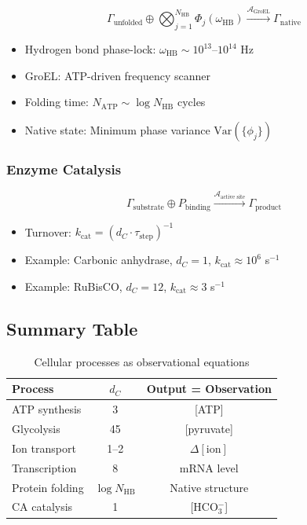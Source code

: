 \documentclass[aps,prd,twocolumn,superscriptaddress,floatfix,nofootinbib]{revtex4-2}
\theoremstyle{remark}
\newcommand{\Pop}{P}
\newcommand{\Gstate}{\Gamma}
\begin{document}
\begin{equation}
\Gstate_{\text{unfolded}} \oplus \bigotimes_{j=1}^{N_{\text{HB}}} \Phi_j(\omega_{\text{HB}}) \xrightarrow{\mathcal{A}_{\text{GroEL}}} \Gstate_{\text{native}}
\end{equation}

\begin{itemize}
\item Hydrogen bond phase-lock: $\omega_{\text{HB}} \sim 10^{13}$--$10^{14}$ Hz~\cite{fayer2012}
\item GroEL: ATP-driven frequency scanner~\cite{horwich1999,hartl2011}
\item Folding time: $N_{\text{ATP}} \sim \log N_{\text{HB}}$ cycles~\cite{anfinsen1973}
\item Native state: Minimum phase variance $\text{Var}(\{\phi_j\})$~\cite{onuchic2004}
\end{itemize}

\subsubsection{Enzyme Catalysis}

\begin{equation}
\Gstate_{\text{substrate}} \oplus \Pop_{\text{binding}} \xrightarrow{\mathcal{A}_{\text{active site}}} \Gstate_{\text{product}}
\end{equation}

\begin{itemize}
\item Turnover: $k_{\text{cat}} = (d_C \cdot \tau_{\text{step}})^{-1}$~\cite{michaelis1913,fersht1999}
\item Example: Carbonic anhydrase, $d_C = 1$, $k_{\text{cat}} \approx 10^6$ s$^{-1}$~\cite{lindskog1997}
\item Example: RuBisCO, $d_C = 12$, $k_{\text{cat}} \approx 3$ s$^{-1}$~\cite{andersson2008}
\end{itemize}

\subsection{Summary Table}

\begin{table}[h]
\centering
\caption{Cellular processes as observational equations}
\label{tab:processes}
\begin{tabular}{@{}lcc@{}}
\toprule
Process & $d_C$ & Output = Observation \\
\midrule
ATP synthesis & 3 & [ATP] \\
Glycolysis & 45 & [pyruvate] \\
Ion transport & 1--2 & $\Delta[\text{ion}]$ \\
Transcription & 8 & mRNA level \\
Protein folding & $\log N_{\text{HB}}$ & Native structure \\
CA catalysis & 1 & [HCO$_3^-$] \\
\bottomrule
\end{tabular}
\end{table}
\end{document}
